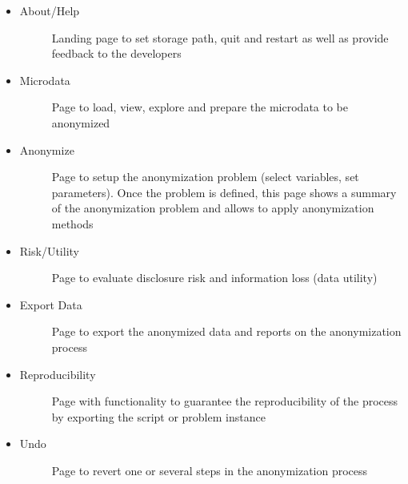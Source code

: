 \documentclass[letterpaper,10pt,english]{sphinxmanual}
\begin{document}
\begin{itemize}
\item {} \begin{description}
\item[{About/Help}] \leavevmode
Landing page to set storage path, quit and restart  as well as provide feedback to the developers

\end{description}

\item {} \begin{description}
\item[{Microdata}] \leavevmode
Page to load, view, explore and prepare the microdata to be anonymized

\end{description}

\item {} \begin{description}
\item[{Anonymize}] \leavevmode
Page to setup the anonymization problem (select variables, set parameters). Once the
problem is defined, this page shows a summary of the anonymization problem and allows
to apply anonymization methods

\end{description}

\item {} \begin{description}
\item[{Risk/Utility}] \leavevmode
Page to evaluate disclosure risk and information loss (data utility)

\end{description}

\item {} \begin{description}
\item[{Export Data}] \leavevmode
Page to export the anonymized data and reports on the anonymization process

\end{description}

\item {} \begin{description}
\item[{Reproducibility}] \leavevmode
Page with functionality to guarantee the reproducibility of the process by exporting the
 script or problem instance

\end{description}

\item {} \begin{description}
\item[{Undo}] \leavevmode
Page to revert one or several steps in the anonymization process

\end{description}

\end{itemize}
\end{document}
